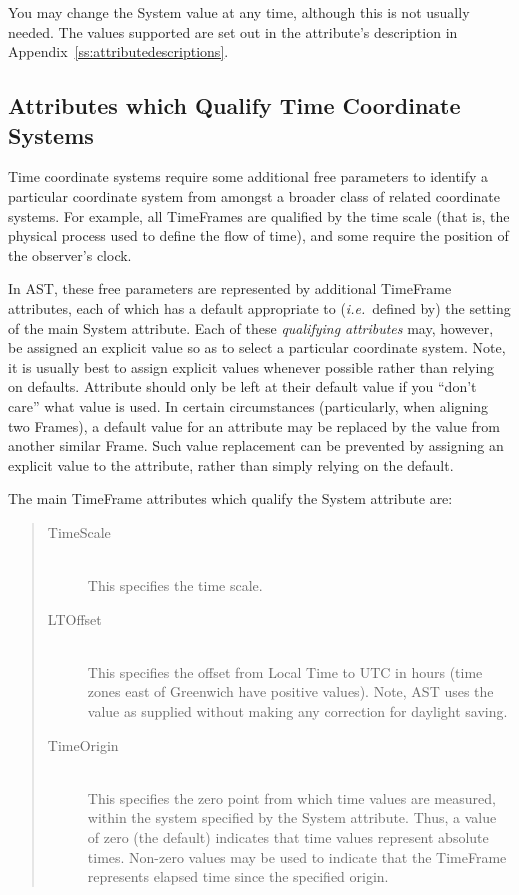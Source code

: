 \documentclass[twoside,11pt]{starlink}
\providecommand{\appref}[1]{Appendix~\ref{#1}}
\begin{document}
You may change the System value at any time, although this is not
usually needed.  The values supported are set out in the attribute's
description in \appref{ss:attributedescriptions}.

\subsection{Attributes which Qualify Time Coordinate Systems}

Time coordinate systems require some additional free parameters to identify
a particular coordinate system from amongst a broader class of related
coordinate systems. For example, all TimeFrames are qualified by the time
scale (that is, the physical process used to define the flow of time),
and some require the position of the observer's clock.

In AST, these free parameters are represented by additional TimeFrame
attributes, each of which has a default appropriate to (\emph{i.e.}\ defined
by) the setting of the main System attribute. Each of these \emph{qualifying
attributes} may, however, be assigned an explicit value so as to select a
particular coordinate system. Note, it is usually best to assign explicit
values whenever possible rather than relying on defaults. Attribute
should only be left at their default value if you ``don't care'' what
value is used. In certain circumstances (particularly, when aligning two
Frames), a default value for an attribute may be replaced by the value
from another similar Frame. Such value replacement can be prevented by
assigning an explicit value to the attribute, rather than simply relying on
the default.

The main TimeFrame attributes which qualify the System attribute are:

\begin{quote}
\begin{description}

\item[TimeScale]\mbox{}\\
This specifies the time scale.

\item[LTOffset]\mbox{}\\
This specifies the offset from Local Time to UTC in hours (time zones
east of Greenwich have positive values). Note, AST uses the value as
supplied without making any correction for daylight saving.

\item[TimeOrigin]\mbox{}\\
This specifies the zero point from which time values are measured, within
the system specified by the System attribute. Thus, a value of zero (the
default) indicates that time values represent absolute times. Non-zero
values may be used to indicate that the TimeFrame represents elapsed time
since the specified origin.

\end{description}
\end{quote}
\end{document}
